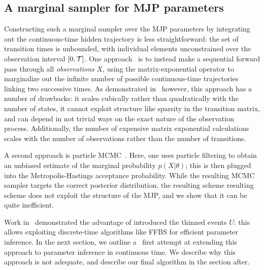 \subsection{A marginal sampler for MJP parameters} 
Constructing such a marginal sampler over the MJP parameters by
integrating out the continuous-time hidden trajectory is less straightforward:
the set of transition times is unbounded, with individual elements
unconstrained over the observation interval $[0,{\mathcal T}]$.
One approach~\cite{FearnSher2006} is to instead make a sequential 
forward pass through all {\em observations} $X$, using the matrix-exponential
operator to marginalize out the infinite number of possible 
continuous-time trajectories linking two successive times. As
demonstrated in~\cite{RaoTeh13} however, this approach has a number of 
drawbacks: it scales cubically rather than quadratically with the 
number of states, it cannot exploit structure like sparsity in the 
transition matrix, and can depend in not trivial ways on the exact 
nature of the observation process.
Additionally, the number of expensive matrix exponential calculations scales
with the number of observations rather than the number of transitions.


A second approach is particle MCMC~\cite{Andrieu10}. Here, one uses 
particle filtering to obtain an unbiased estimate of the marginal 
probability $p(X|\theta)$; this is then plugged into the 
Metropolis-Hastings acceptance probability. While the resulting MCMC 
sampler targets the correct posterior distribution, %
the resulting scheme resulting scheme does not exploit the structure 
of the MJP, and we show that it can be quite inefficient.

Work in~\cite{RaoTeh13, RaoTeh12} demonstrated the advantage of
introduced the thinned events $U$: this allows exploiting discrete-time 
algorithms like FFBS for efficient parameter inference.
In the next section, we outline a \naive\  first attempt at extending this 
approach to parameter inference in continuous time.
We describe why this approach is not adequate, and describe our
final algorithm in the section after. 

